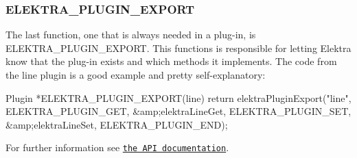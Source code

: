 \subsubsection*{E\+L\+E\+K\+T\+R\+A\+\_\+\+P\+L\+U\+G\+I\+N\+\_\+\+E\+X\+P\+O\+R\+T}

The last function, one that is always needed in a plug-\/in, is {\ttfamily E\+L\+E\+K\+T\+R\+A\+\_\+\+P\+L\+U\+G\+I\+N\+\_\+\+E\+X\+P\+O\+R\+T}. This functions is responsible for letting Elektra know that the plug-\/in exists and which methods it implements. The code from the line plugin is a good example and pretty self-\/explanatory\+: \begin{DoxyVerb}    Plugin *ELEKTRA_PLUGIN_EXPORT(line)
    {
            return elektraPluginExport("line",
            ELEKTRA_PLUGIN_GET, &amp;elektraLineGet,
            ELEKTRA_PLUGIN_SET, &amp;elektraLineSet,
            ELEKTRA_PLUGIN_END);
    }
\end{DoxyVerb}


For further information see \href{http://doc.libelektra.org/api/current/html/group__plugin.html}{\tt the A\+P\+I documentation}. 